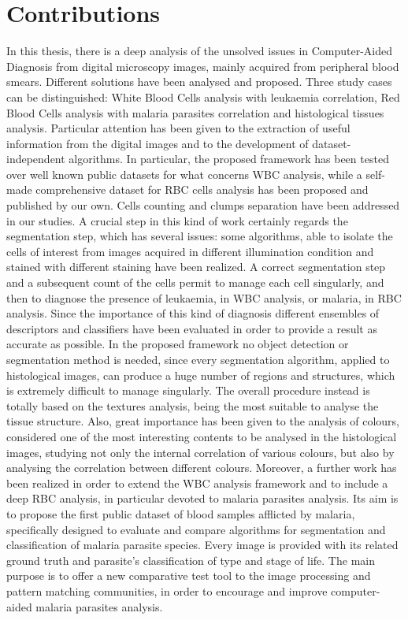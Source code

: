 \documentclass[final,a4paper,12pt,english]{UnicaPhdThesis3}
\begin{document}
\section{Contributions} 
In this thesis, there is a deep analysis of the unsolved issues in Computer-Aided Diagnosis from digital microscopy images, mainly acquired from peripheral blood smears. Different solutions have been analysed and proposed. Three study cases can be distinguished: White Blood Cells analysis with leukaemia correlation, Red Blood Cells analysis with malaria parasites correlation and histological tissues analysis. Particular attention has been given to the extraction of useful information from the digital images and to the development of dataset-independent algorithms. In particular, the proposed framework has been tested over well known public datasets for what concerns WBC analysis, while a self-made comprehensive dataset for RBC cells analysis has been proposed and published by our own. Cells counting and clumps separation have been addressed in our studies. A crucial step in this kind of work certainly regards the segmentation step, which has several issues: some algorithms, able to isolate the cells of interest from images acquired in different illumination condition and stained with different staining have been realized. A correct segmentation step and a subsequent count of the cells permit to manage each cell singularly, and then to diagnose the presence of leukaemia, in WBC analysis, or malaria, in RBC analysis. Since the importance of this kind of diagnosis different ensembles of descriptors and classifiers have been evaluated in order to provide a result as accurate as possible. In the proposed framework no object detection or segmentation method is needed, since every segmentation algorithm, applied to histological images, can produce a huge number of regions and structures, which is extremely difficult to manage singularly. The overall procedure instead is totally based on the textures analysis, being the most suitable to analyse the tissue structure. Also, great importance has been given to the analysis of colours, considered one of the most interesting contents to be analysed in the histological images, studying not only the internal correlation of various colours, but also by analysing the correlation between different colours.
Moreover, a further work has been realized in order to extend the WBC analysis framework and to include a deep RBC analysis, in particular devoted to malaria parasites analysis. Its aim is to propose the first public dataset of blood samples afflicted by malaria, specifically designed to evaluate and compare algorithms for segmentation and classification of malaria parasite species. Every image is provided with its related ground truth and parasite’s classification of type and stage of life. The main purpose is to offer a new comparative test tool to the image processing and pattern matching communities, in order to encourage and improve computer-aided malaria parasites analysis.
\end{document}
